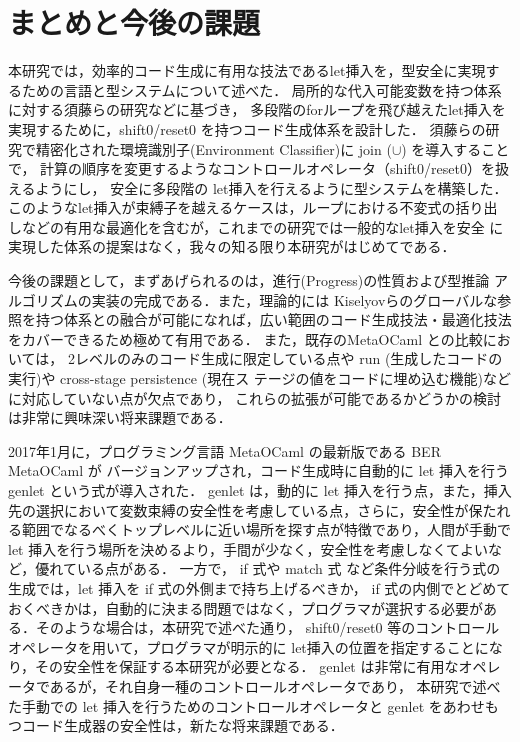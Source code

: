 \chapter{まとめと今後の課題}
本研究では，効率的コード生成に有用な技法であるlet挿入を，型安全に実現す
るための言語と型システムについて述べた．
局所的な代入可能変数を持つ体系に対する須藤らの研究\cite{Sudo2014}などに基づき，
多段階のforループを飛び越えたlet挿入を実現するために，shift0/reset0 を持つコード生成体系を設計した．
須藤らの研究で精密化された環境識別子(Environment Classifier)に join ($\cup$) を導入することで，
計算の順序を変更するようなコントロールオペレータ（shift0/reset0）を扱えるようにし，
安全に多段階の let挿入を行えるように型システムを構築した．
このようなlet挿入が束縛子を越えるケースは，ループにおける不変式の括り出
しなどの有用な最適化を含むが，これまでの研究では一般的なlet挿入を安全
に実現した体系の提案はなく，我々の知る限り本研究がはじめてである．

今後の課題として，まずあげられるのは，進行(Progress)の性質および型推論
アルゴリズムの実装の完成である．また，理論的には Kiselyovらのグローバルな参
照を持つ体系との融合が可能になれば，広い範囲のコード生成技法・最適化技法
をカバーできるため極めて有用である．
また，既存のMetaOCaml との比較においては，
2レベルのみのコード生成に限定している点や
run (生成したコードの実行)や cross-stage persistence (現在ス
テージの値をコードに埋め込む機能)などに対応していない点が欠点であり，
これらの拡張が可能であるかどうかの検討は非常に興味深い将来課題である．

2017年1月に，プログラミング言語 MetaOCaml の最新版である BER MetaOCaml が バージョンアップされ，コード生成時に自動的に let 挿入を行う genlet という式が導入された．
genlet は，動的に let 挿入を行う点，また，挿入先の選択において変数束縛の安全性を考慮している点，さらに，安全性が保たれる範囲でなるべくトップレベルに近い場所を探す点が特徴であり，人間が手動で let 挿入を行う場所を決めるより，手間が少なく，安全性を考慮しなくてよいなど，優れている点がある．
一方で， if 式や match 式 など条件分岐を行う式の生成では，let 挿入を if 式の外側まで持ち上げるべきか， if 式の内側でとどめておくべきかは，自動的に決まる問題ではなく，プログラマが選択する必要がある．そのような場合は，本研究で述べた通り， shift0/reset0 等のコントロールオペレータを用いて，プログラマが明示的に let挿入の位置を指定することになり，その安全性を保証する本研究が必要となる．
genlet は非常に有用なオペレータであるが，それ自身一種のコントロールオペレータであり，
本研究で述べた手動での let 挿入を行うためのコントロールオペレータと genlet をあわせもつコード生成器の安全性は，新たな将来課題である．

